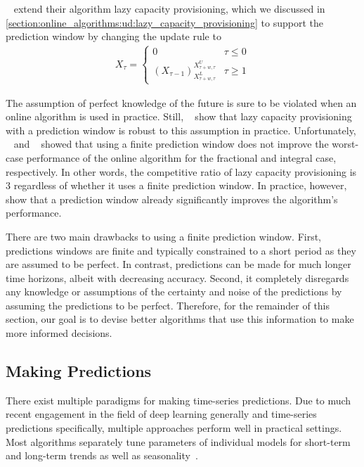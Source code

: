 \citeauthor*{Lin2011}~\cite{Lin2011} extend their algorithm lazy capacity provisioning, which we discussed in \cref{section:online_algorithms:ud:lazy_capacity_provisioning} to support the prediction window by changing the update rule to \begin{align*}
    X_{\tau} = \begin{cases}
        0 & \tau \leq 0 \\
        (X_{\tau-1})_{X_{\tau+w,\tau}^L}^{X_{\tau+w,\tau}^U} & \tau \geq 1
    \end{cases}
\end{align*}

The assumption of perfect knowledge of the future is sure to be violated when an online algorithm is used in practice. Still, \citeauthor*{Lin2011}~\cite{Lin2011} show that lazy capacity provisioning with a prediction window is robust to this assumption in practice. Unfortunately, \citeauthor*{Lin2011}~\cite{Lin2011} and \citeauthor*{Albers2018}~\cite{Albers2018} showed that using a finite prediction window does not improve the worst-case performance of the online algorithm for the fractional and integral case, respectively. In other words, the competitive ratio of lazy capacity provisioning is $3$ regardless of whether it uses a finite prediction window. In practice, however, \citeauthor*{Lin2011}~\cite{Lin2011} show that a prediction window already significantly improves the algorithm's performance.

There are two main drawbacks to using a finite prediction window. First, predictions windows are finite and typically constrained to a short period as they are assumed to be perfect. In contrast, predictions can be made for much longer time horizons, albeit with decreasing accuracy. Second, it completely disregards any knowledge or assumptions of the certainty and noise of the predictions by assuming the predictions to be perfect. Therefore, for the remainder of this section, our goal is to devise better algorithms that use this information to make more informed decisions.

\subsection{Making Predictions}\label{section:online_algorithms:md:predictions:making_predictions}

There exist multiple paradigms for making time-series predictions. Due to much recent engagement in the field of deep learning generally and time-series predictions specifically, multiple approaches perform well in practical settings. Most algorithms separately tune parameters of individual models for short-term and long-term trends as well as seasonality~\cite{Taylor2017, Hosseini2021}.

